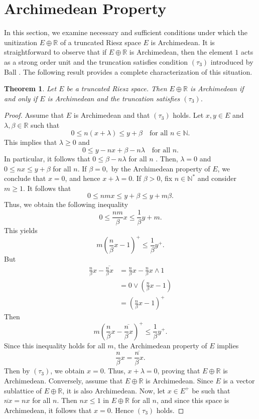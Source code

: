 \documentclass{birkau}
\numberwithin{equation}{section}
\theoremstyle{plain}
\newtheorem{theorem}{Theorem}[section]
\theoremstyle{definition}
\begin{document}
\section{Archimedean Property}
In this section, we examine necessary and sufficient conditions under which
the unitization $E \oplus\mathbb{R}$ of a truncated Riesz space $E$ is Archimedean.
It is straightforward to observe that if $E \oplus\mathbb{R}$ is Archimedean,
then the element $1$ acts as a strong order unit and the truncation satisfies
condition $(\tau_{3})$ introduced by Ball \cite{Ball1}. The following result provides a
complete characterization of this situation.
\begin{theorem}
	Let $E$ be a truncated Riesz space. Then $E \oplus\mathbb{R}$ is Archimedean
	if and only if $E$ is Archimedean and the truncation satisfies $(\tau_{3})$.
\end{theorem}
\begin{proof}
	Assume that $E$ is Archimedean and that $(\tau_{3})$ holds. Let $x,y\in E$ and
	$\lambda,\beta\in\mathbb{R}$ such that
	\[
	0\leq n(x+\lambda)\leq y+\beta\quad\text{for all }n\in\mathbb{N}.
	\]
	This implies that $\lambda\geq0$ and
	\[
	0\leq y-nx+\beta-n\lambda\quad\text{for all }n.
	\]
	In particular, it follows that $0\leq\beta-n\lambda$ for all $n$ . Then,
	$\lambda=0$ and $0\leq nx\leq y+\beta$ for all $n$. If $\beta=0,$ by the
	Archimedean property of $E$, we conclude that $x=0$, and hence $x+\lambda=0$.
	If $\beta>0$, fix $n\in\mathbb{N}^{\ast}$ and consider $m\geq 1$.  It follows that
	$$0\leq nmx\leq y+\beta \leq y+m\beta .$$
	Thus, we obtain the following inequality
	\[
	0\leq\frac{nm}{\beta}x\leq\frac{1}{\beta}y+m.
	\]
	This yields%
	\[
	m\left(  \frac{n}{\beta}x-1\right)  ^{+}\leq\frac{1}{\beta}y^{+}.
	\]
	But%
	\begin{align*}
		\frac{n}{\beta}x-\overline{\frac{n}{\beta}x}  & =\frac{n}{\beta}x-\frac
		{n}{\beta}x\wedge1\\
		& =0\vee\left(  \frac{n}{\beta}x-1\right)  \\
		& =\left(  \frac{n}{\beta}x-1\right)  ^{+}%
	\end{align*}
	Then
	\[
	m\left(  \frac{n}{\beta}x-\overline{\frac{n}{\beta}x}\right)  ^{+}\leq\frac
	{1}{\beta}y^{+}.
	\]
	Since this inequality holds for all $m$, the Archimedean property of $E$
	implies
	\[
	\frac{n}{\beta}x=\overline{\frac{n}{\beta}x}.
	\]
	Then by $(\tau_{3})$, we obtain $x=0$. Thus, $x+\lambda=0$, proving that
	$E\oplus\mathbb{R}$ is Archimedean.
	Conversely, assume that $E \oplus\mathbb{R}$ is Archimedean. Since $E$ is a
	vector sublattice of $E \oplus\mathbb{R}$, it is also Archimedean. Now, let $x
	\in E^{+}$ be such that $\overline{nx} = nx$ for all $n$. Then $nx \leq1$ in
	$E \oplus\mathbb{R}$ for all $n$, and since this space is Archimedean, it
	follows that $x = 0$. Hence $(\tau_{3})$ holds.
\end{proof}
\end{document}
